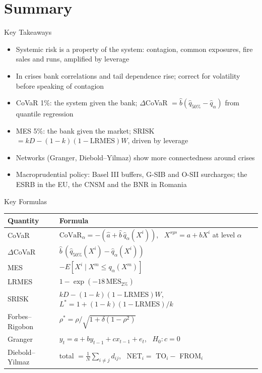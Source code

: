 \section{Summary}

\begin{frame}{Key Takeaways}
\itemsize{\small}
\begin{itemize}
    \item Systemic risk is a property of the system: contagion, common exposures, fire sales and runs, amplified by leverage
    \item In crises bank correlations and tail dependence rise; correct for volatility before speaking of contagion
    \item CoVaR 1\%: the system given the bank; $\Delta$CoVaR $= \hat b(\hat q_{50\%} - \hat q_\alpha)$ from quantile regression
    \item MES 5\%: the bank given the market; SRISK $= kD - (1 - k)(1 - \mathrm{LRMES})W$, driven by leverage
    \item Networks (Granger, Diebold--Yilmaz) show more connectedness around crises
    \item Macroprudential policy: Basel III buffers, G-SIB and O-SII surcharges; the ESRB in the EU, the CNSM and the BNR in Romania
\end{itemize}
\end{frame}

\begin{frame}{Key Formulas}
\itemsize{\small}
{\renewcommand{\arraystretch}{1.45}\begin{center}
\scriptsize
\begin{tabular}{ll}
\toprule
\textbf{Quantity} & \textbf{Formula} \\
\midrule
CoVaR & $\mathrm{CoVaR}_\alpha = -(\hat a + \hat b\,\hat q_\alpha(X^i))$, \ $X^{sys} = a + bX^i$ at level $\alpha$ \\
$\Delta$CoVaR & $\hat b\,(\hat q_{50\%}(X^i) - \hat q_\alpha(X^i))$ \\
MES & $-E[X^i \mid X^m \le q_\alpha(X^m)]$ \\
LRMES & $1 - \exp(-18\,\mathrm{MES}_{2\%})$ \\
SRISK & $kD - (1 - k)(1 - \mathrm{LRMES})W$, \ $L^* = 1 + (1 - k)(1 - \mathrm{LRMES})/k$ \\
Forbes--Rigobon & $\rho^* = \rho/\sqrt{1 + \delta(1 - \rho^2)}$ \\
Granger & $y_t = a + by_{t-1} + cx_{t-1} + e_t$, \ $H_0: c = 0$ \\
Diebold--Yilmaz & total $= \frac1N\sum_{i \ne j} d_{ij}$, \ NET$_i = $ TO$_i - $ FROM$_i$ \\
\bottomrule
\end{tabular}
\end{center}
}
\end{frame}

